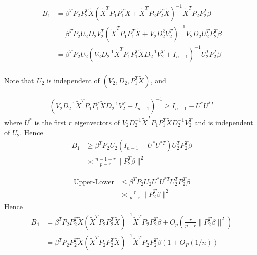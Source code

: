 \documentclass[review]{elsarticle}
\theoremstyle{plain}
\theoremstyle{definition}
\theoremstyle{remark}
\begin{document}
\begin{equation}
    \begin{aligned}
        B_1&= \beta^T P_2 P_2^T \tilde{X} {(\tilde{X}^T P_1 P_1^T \tilde{X}+\tilde{X}^T P_2 P_2^T \tilde{X})}^{-1}\tilde{X}^T P_2 P_2^T \beta\\
        &= \beta^T P_2 U_2 D_2 V^T_2 {(\tilde{X}^T P_1 P_1^T \tilde{X}+V_2 D_2^2 V_2^T)}^{-1}V_2 D_2 U_2^T P_2^T \beta\\
        &= \beta^T P_2 U_2  {(V_2 D_2^{-1}\tilde{X}^T P_1 P_1^T \tilde{X}D_2^{-1}V_2^T +I_{n-1})}^{-1} U_2^T P_2^T \beta\\
    \end{aligned}
\end{equation}

Note that $U_2$ is independent of $(V_2,D_2,P_1^T\tilde{X})$, and

\begin{equation}
    \begin{aligned}
        {(V_2 D_2^{-1}\tilde{X}^T P_1 P_1^T \tilde{X}D_2^{-1}V_2^T +I_{n-1})}^{-1}\geq I_{n-1}- U^* U^{*T}
    \end{aligned}
\end{equation}
where $U^*$ is the first $r$ eigenvectors of $V_2 D_2^{-1}\tilde{X}^T P_1 P_1^T \tilde{X}D_2^{-1}V_2^T$ and is independent of $U_2$. Hence
\begin{equation}
    \begin{aligned}
        B_1&\geq \beta^T P_2 U_2 (I_{n-1}-U^* U^{*T})U_2^T P_2^T \beta\\
        &\asymp \frac{n-1-r}{p-r}\|P_2^T \beta\|^2
    \end{aligned}
\end{equation}

\begin{equation}
    \begin{aligned}
        \textrm{Upper-Lower}&\leq \beta^T P_2 U_2 U^* U^{*T}U_2^T P_2^T \beta\\
        &\asymp \frac{r}{p-r}\|P_2^T \beta\|^2
    \end{aligned}
\end{equation}
Hence 
\begin{equation}
    \begin{aligned}
        B_1&=\beta^T P_2 P_2^T \tilde{X} {(\tilde{X}^T P_2 P_2^T \tilde{X})}^{-1}\tilde{X}^T P_2 P_2^T \beta+O_p(\frac{r}{p-r}\|P_2^T \beta\|^2)\\
        &=\beta^T P_2 P_2^T \tilde{X} {(\tilde{X}^T P_2 P_2^T \tilde{X})}^{-1}\tilde{X}^T P_2 P_2^T \beta(1+O_P(1/n))\\
    \end{aligned}
\end{equation}
\end{document}
